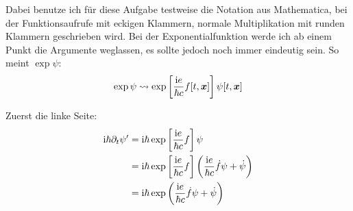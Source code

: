 Dabei benutze ich für diese Aufgabe testweise die Notation aus Mathematica, bei
der Funktionsaufrufe mit eckigen Klammern, normale Multiplikation mit runden
Klammern geschrieben wird. Bei der Exponentialfunktion werde ich ab einem Punkt
die Argumente weglassen, es sollte jedoch noch immer eindeutig sein. So meint
$\exp \psi$:
\[
	\exp\psi \leadsto \Call\exp{\frac{\ii e}{\hbar c} \call f{t, \vec x}} \call \psi{t, \vec x}
\]

Zuerst die linke Seite:
\begin{align*}
	\ii \hbar \partial_t \psi'
	&= \ii \hbar \Call\exp{\frac{\ii e}{\hbar c} f} \psi \\
	&= \ii \hbar \Call\exp{\frac{\ii e}{\hbar c} f} \del{\frac{\ii e}{\hbar c} \dot f \psi + \dot \psi} \\
	&= \ii \hbar \exp \del{\frac{\ii e}{\hbar c} \dot f \psi + \dot \psi}
\end{align*}

